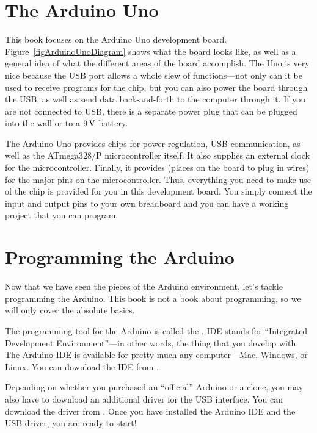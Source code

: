 \section{The Arduino Uno}


This book focuses on the Arduino Uno development board.
Figure~\ref{figArduinoUnoDiagram} shows what the board looks like, as well as a general idea of what the different areas of the board accomplish.
The Uno is very nice because the USB port allows a whole slew of functions---not only can it be used to receive programs for the chip, but you can also power the board through the USB, as well as send data back-and-forth to the computer through it.
If you are not connected to USB, there is a separate power plug that can be plugged into the wall or to a $9\,\si{\volt}$ battery.

The Arduino Uno provides chips for power regulation, USB communication, as well as the ATmega328/P microcontroller itself.
It also supplies an external clock for the microcontroller.
Finally, it provides  (places on the board to plug in wires) for the major pins on the microcontroller.
Thus, everything you need to make use of the chip is provided for you in this development board.
You simply connect the input and output pins to your own breadboard and you can have a working project that you can program.

\section{Programming the Arduino}
\label{secProgrammingArduino}

Now that we have seen the pieces of the Arduino environment, let's tackle programming the Arduino.
This book is not a book about programming, so we will only cover the absolute basics.

The programming tool for the Arduino is called the .
IDE stands for ``Integrated Development Environment''---in other words, the thing that you develop with.
The Arduino IDE is available for pretty much any computer---Mac, Windows, or Linux.
You can download the IDE from .

Depending on whether you purchased an ``official'' Arduino or a clone, you may also have to download an additional driver for the USB interface.
You can download the driver from .
Once you have installed the Arduino IDE and the USB driver, you are ready to start!

